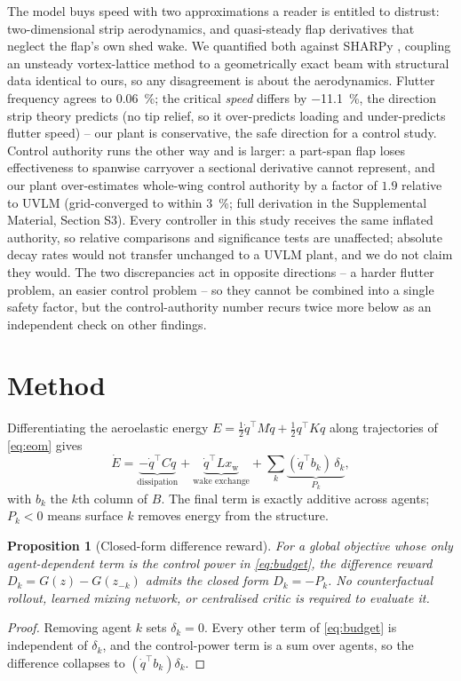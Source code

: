 \documentclass[preprint,11pt]{elsarticle}
\newtheorem{proposition}{Proposition}
\begin{document}
The model buys speed with two approximations a reader is entitled to
distrust: two-dimensional strip aerodynamics, and quasi-steady flap
derivatives that neglect the flap's own shed wake. We quantified both
against SHARPy \cite{delcarre2019sharpy}, coupling an unsteady
vortex-lattice method \cite{murua2012uvlm} to a geometrically exact beam
with structural data identical to ours, so any disagreement is about the
aerodynamics. Flutter frequency agrees to \SI{0.06}{\percent}; the critical
\emph{speed} differs by \SI{-11.1}{\percent}, the direction strip theory
predicts (no tip relief, so it over-predicts loading and under-predicts
flutter speed) -- our plant is conservative, the safe direction for a
control study. Control authority runs the other way and is larger: a
part-span flap loses effectiveness to spanwise carryover a sectional
derivative cannot represent, and our plant over-estimates whole-wing
control authority by a factor of $1.9$ relative to UVLM (grid-converged to
within \SI{3}{\percent}; full derivation in the Supplemental Material,
Section S3). Every controller in this study receives the same inflated
authority, so relative comparisons and significance tests are unaffected;
absolute decay rates would not transfer unchanged to a UVLM plant, and we
do not claim they would. The two discrepancies act in opposite directions
-- a harder flutter problem, an easier control problem -- so they cannot be
combined into a single safety factor, but the control-authority number
recurs twice more below as an independent check on other findings.

\section{Method}
\label{sec:method}

Differentiating the aeroelastic energy
$E=\tfrac12 \dot q^{\top} M \dot q + \tfrac12 q^{\top} K q$ along
trajectories of \eqref{eq:eom} gives
\begin{equation}
\dot E
= \underbrace{-\dot q^{\top} C \dot q}_{\text{dissipation}}
+ \underbrace{\dot q^{\top} L x_{\mathrm{w}}}_{\text{wake exchange}}
+ \sum_{k} \underbrace{(\dot q^{\top} b_k)\, \delta_k}_{P_k} ,
\label{eq:budget}
\end{equation}
with $b_k$ the $k$th column of $B$. The final term is exactly additive
across agents; $P_k<0$ means surface $k$ removes energy from the structure.

\begin{proposition}[Closed-form difference reward]
\label{prop:diff}
For a global objective whose only agent-dependent term is the control power
in \eqref{eq:budget}, the difference reward $D_k = G(z) - G(z_{-k})$ admits
the closed form $D_k = -P_k$. No counterfactual rollout, learned mixing
network, or centralised critic is required to evaluate it.
\end{proposition}
\begin{proof}
Removing agent $k$ sets $\delta_k=0$. Every other term of \eqref{eq:budget}
is independent of $\delta_k$, and the control-power term is a sum over
agents, so the difference collapses to $(\dot q^{\top} b_k)\delta_k$.
\end{proof}
\end{document}
